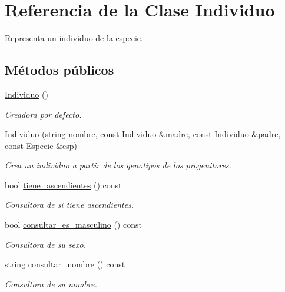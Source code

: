 \hypertarget{class_individuo}{}\section{Referencia de la Clase Individuo}
\label{class_individuo}


Representa un individuo de la especie.  


\subsection*{Métodos públicos}
\begin{DoxyCompactItemize}
\item 
\hyperlink{class_individuo_a3042a660b9789ee24dd3658248c8e0b9}{Individuo} ()
\begin{DoxyCompactList}\small\item\em Creadora por defecto. \end{DoxyCompactList}\item 
\hyperlink{class_individuo_aa4e303d7179a1ad0f0f2986d093d830a}{Individuo} (string nombre, const \hyperlink{class_individuo}{Individuo} \&madre, const \hyperlink{class_individuo}{Individuo} \&padre, const \hyperlink{class_especie}{Especie} \&esp)
\begin{DoxyCompactList}\small\item\em Crea un individuo a partir de los genotipos de los progenitores. \end{DoxyCompactList}\item 
bool \hyperlink{class_individuo_a35c602df3c6e1f186b7494513208b716}{tiene\+\_\+ascendientes} () const
\begin{DoxyCompactList}\small\item\em Consultora de si tiene ascendientes. \end{DoxyCompactList}\item 
bool \hyperlink{class_individuo_a27159ca95f0e9d8b14685dfa40f4e563}{consultar\+\_\+es\+\_\+masculino} () const
\begin{DoxyCompactList}\small\item\em Consultora de su sexo. \end{DoxyCompactList}\item 
string \hyperlink{class_individuo_aa9a26cf22c424ced4ca468af5f203300}{consultar\+\_\+nombre} () const
\begin{DoxyCompactList}\small\item\em Consultora de su nombre. \end{DoxyCompactList}\item 

\end{DoxyCompactItemize}
